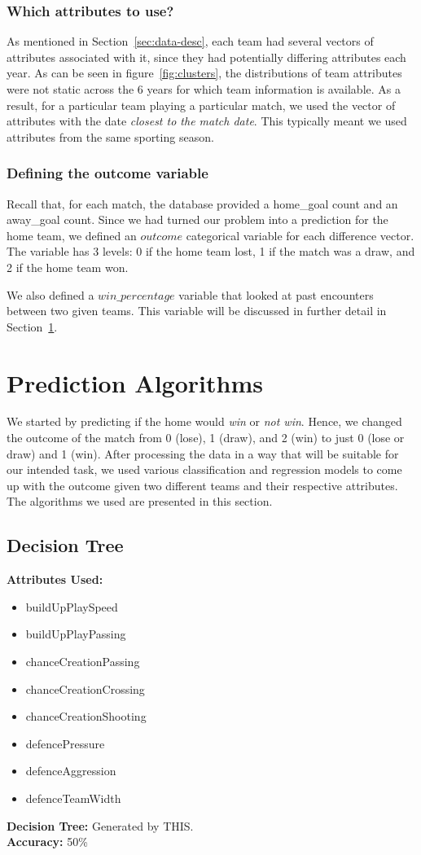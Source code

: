 \documentclass[11pt]{article}
\begin{document}
\subsubsection{Which attributes to use?}
As mentioned in Section~\ref{sec:data-desc}, each team had several vectors of attributes associated with it, since they had potentially differing attributes each year.
As can be seen in figure~\ref{fig:clusters}, the distributions of team attributes were not static across the 6 years for which team information is available.
As a result, for a particular team playing a particular match, we used the vector of attributes with the date \textit{closest to the match date}.
This typically meant we used attributes from the same sporting season.

\subsubsection{Defining the outcome variable}
Recall that, for each match, the database provided a home\_goal count and an away\_goal count.
Since we had turned our problem into a prediction for the home team, we defined an $outcome$ categorical variable for each difference vector.
The variable has 3 levels: 0 if the home team lost, 1 if the match was a draw, and 2 if the home team won.

We also defined a $win\_percentage$ variable that looked at past encounters between two given teams.
This variable will be discussed in further detail in Section~\ref{sec:models}.

\section{Prediction Algorithms}
\label{sec:models}
We started by predicting if the home would \textit{win} or \textit{not win}.
Hence, we changed the outcome of the match from 0 (lose), 1 (draw), and 2 (win) to just 0 (lose or draw) and 1 (win).
After processing the data in a way that will be suitable for our intended task, we used various classification and regression models to come up with the outcome given two different teams and their respective attributes.
The algorithms we used are presented in this section.

\subsection{Decision Tree}
\textbf{Attributes Used:}
\begin{itemize}
  \setlength\itemsep{0em}
  \item buildUpPlaySpeed
  \item buildUpPlayPassing
  \item chanceCreationPassing
  \item chanceCreationCrossing
  \item chanceCreationShooting
  \item defencePressure
  \item defenceAggression
  \item defenceTeamWidth
\end{itemize}
\textbf{Decision Tree:}
Generated by THIS.\\
\textbf{Accuracy:} 50\%
\end{document}
